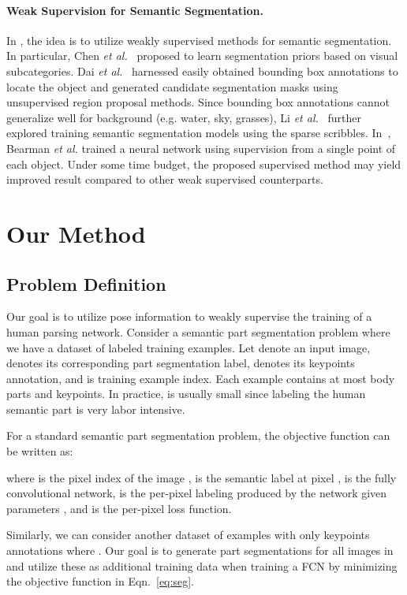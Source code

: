 \documentclass[10pt,twocolumn,letterpaper]{article}
\begin{document}
\paragraph{Weak Supervision for Semantic Segmentation.}
In \cite{pathak2014fully,chen2014enriching,papandreou2015weakly,dai2015boxsup,lin2016scribblesup,bearman2016s}, the idea is to utilize weakly supervised methods for semantic segmentation. In particular, Chen \emph{et al.}~\cite{chen2014enriching} proposed to learn segmentation priors based on visual subcategories. Dai \emph{et al.}~\cite{dai2015boxsup} harnessed easily obtained bounding box annotations to locate the object and generated candidate segmentation masks using unsupervised region proposal methods. Since bounding box annotations cannot generalize well for background (e.g. water, sky, grasses), Li \emph{et al.}~\cite{lin2016scribblesup} further explored training semantic segmentation models using the sparse scribbles. In~\cite{bearman2016s}, Bearman \emph{et al.} trained a neural network using supervision from a single point of each object. Under some time budget, the proposed supervised method may yield improved result compared to other weak supervised counterparts.

\section{Our Method}
\subsection{Problem Definition}
Our goal is to utilize pose information to weakly supervise the training of a human parsing network. Consider a semantic part segmentation problem where we have a dataset  of  labeled training examples. Let  denote an input image,  denotes its corresponding part segmentation label,  denotes its keypoints annotation, and  is training example index. Each example contains at most  body parts and  keypoints. In practice,  is usually small since labeling the human semantic part is very labor intensive.

For a standard semantic part segmentation problem, the objective function can be written as:

where  is the pixel index of the image ,  is the semantic label at pixel ,  is the fully convolutional network,  is the per-pixel labeling produced by the network given parameters , and  is the per-pixel loss function.

Similarly, we can consider another dataset  of  examples with only keypoints annotations where . Our goal is to generate part segmentations for all images in  and utilize these as additional training data when training a FCN by minimizing the objective function in Eqn.~\ref{eq:seg}.
\end{document}
